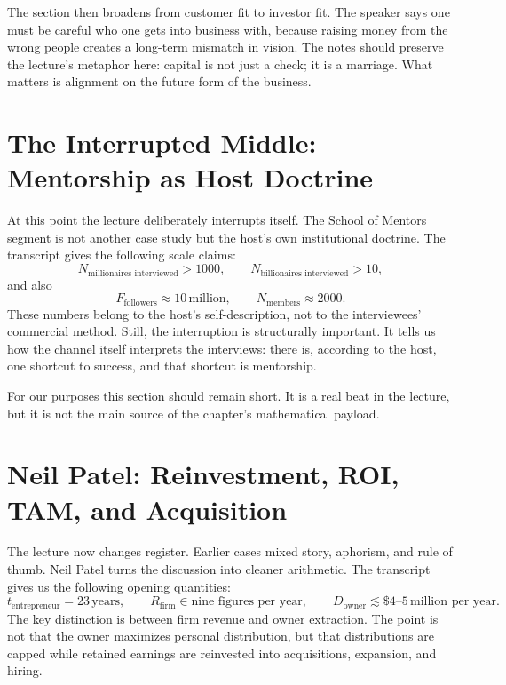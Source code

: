 The section then broadens from customer fit to investor fit. The speaker says one must be careful who one gets into business with, because raising money from the wrong people creates a long-term mismatch in vision. The notes should preserve the lecture's metaphor here: capital is not just a check; it is a marriage. What matters is alignment on the future form of the business.

\section{The Interrupted Middle: Mentorship as Host Doctrine}

At this point the lecture deliberately interrupts itself. The School of Mentors segment is not another case study but the host's own institutional doctrine. The transcript gives the following scale claims:
\begin{equation}
N_{\text{millionaires interviewed}} > 1000, \qquad N_{\text{billionaires interviewed}} > 10,
\end{equation}
and also
\begin{equation}
F_{\text{followers}} \approx 10\,\text{million}, \qquad N_{\text{members}} \approx 2000.
\end{equation}
These numbers belong to the host's self-description, not to the interviewees' commercial method. Still, the interruption is structurally important. It tells us how the channel itself interprets the interviews: there is, according to the host, one shortcut to success, and that shortcut is mentorship.

For our purposes this section should remain short. It is a real beat in the lecture, but it is not the main source of the chapter's mathematical payload.

\section{Neil Patel: Reinvestment, ROI, TAM, and Acquisition}

The lecture now changes register. Earlier cases mixed story, aphorism, and rule of thumb. Neil Patel turns the discussion into cleaner arithmetic. The transcript gives us the following opening quantities:
\begin{equation}
t_{\text{entrepreneur}} = 23\,\text{years}, \qquad
R_{\text{firm}} \in \text{nine figures per year}, \qquad
D_{\text{owner}} \lesssim \$4\text{--}5\,\text{million per year}.
\end{equation}
The key distinction is between firm revenue and owner extraction. The point is not that the owner maximizes personal distribution, but that distributions are capped while retained earnings are reinvested into acquisitions, expansion, and hiring.

